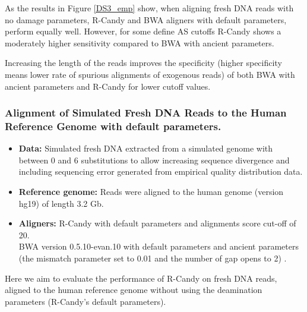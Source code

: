 \documentclass[11pt,a4paper]{report}
\begin{document}
As the results in Figure \ref{DS3_emp} show, when aligning fresh DNA reads with 
no damage parameters, R-Candy and BWA aligners with default parameters, perform
equally well. However, for some define AS cutoffs R-Candy shows a moderately higher 
sensitivity compared to BWA with ancient parameters.

Increasing the length of the reads improves the specificity (higher specificity 
means lower rate of spurious alignments of exogenous reads) of both BWA with 
ancient parameters and R-Candy for lower cutoff values.





\subsubsection{ Alignment of Simulated Fresh DNA Reads to the Human Reference Genome
with default parameters.}

\label{ Alignment of Simulated Fresh DNA Reads to a the Human Reference Genome with
default parameters.}


 \begin{itemize}
 
   \item \textbf{Data:} Simulated fresh DNA extracted from a simulated genome 
   with between 0 and 6 substitutions to allow increasing sequence divergence
   and including sequencing error generated from empirical quality distribution
   data.
   
   \item \textbf{Reference genome:} Reads were aligned to the human genome 
   (version hg19) of length 3.2 Gb.

    \item \textbf{Aligners:} 
    R-Candy with default parameters and alignments score cut-off of 20. \\
    BWA version 0.5.10-evan.10 with default parameters and ancient parameters
    (the mismatch parameter set to 0.01 and the number of gap  opens to 2)
    \cite{green2010draft}.
	
 \end{itemize}
	
	
Here we aim to evaluate the performance of R-Candy on fresh DNA reads, aligned 
to the human reference genome without using the deamination parameters (R-Candy's 
default parameters).
\end{document}

